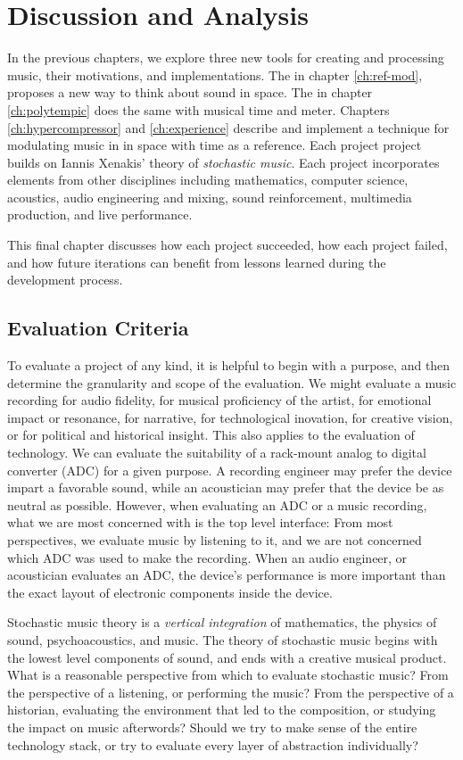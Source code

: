 \clearpage
\chapter{Discussion and Analysis}
\label{ch:analysis}
In the previous chapters, we explore three new tools for creating and
processing music, their motivations, and implementations. The 
in chapter \ref{ch:ref-mod}, proposes a new way to think about sound
in space. The \polytempic in chapter \ref{ch:polytempic} does the same
with musical time and meter. Chapters \ref{ch:hypercompressor} and
\ref{ch:experience} describe and implement a technique for modulating
music in in space with time as a reference. Each project project
builds on Iannis Xenakis' theory of \textit{stochastic music}. Each
project incorporates elements from other disciplines including
mathematics, computer science, acoustics, audio engineering and
mixing, sound reinforcement, multimedia production, and live
performance.

This final chapter discusses how each project succeeded, how each
project failed, and how future iterations can benefit from lessons
learned during the development process.

\section{Evaluation Criteria}
\label{sec:eval-criteria}
To evaluate a project of any kind, it is helpful to begin with a
purpose, and then determine the granularity and scope of the
evaluation.\cite{Saltzer2009} We might evaluate a music recording for
audio fidelity, for musical proficiency of the artist, for emotional
impact or resonance, for narrative, for technological inovation, for
creative vision, or for political and historical insight. This also
applies to the evaluation of technology.  We can evaluate the
suitability of a rack-mount analog to digital converter (ADC) for a
given purpose. A recording engineer may prefer the device impart a
favorable sound, while an acoustician may prefer that the device be
as neutral as possible. However, when evaluating an ADC or a music
recording, what we are most concerned with is the top level interface:
From most perspectives, we evaluate music by listening to it, and we
are not concerned which ADC was used to make the recording. When an
audio engineer, or acoustician evaluates an ADC, the device's
performance is more important than the exact layout of electronic
components inside the device.

Stochastic music theory is a \textit{vertical integration} of
mathematics, the physics of sound, psychoacoustics, and music. The
theory of stochastic music begins with the lowest level components of
sound, and ends with a creative musical product. What is a reasonable
perspective from which to evaluate stochastic music? From the
perspective of a listening, or performing the music? From the
perspective of a historian, evaluating the environment that led to the
composition, or studying the impact on music afterwords?  Should we try
to make sense of the entire technology stack, or try to evaluate every
layer of abstraction individually?

